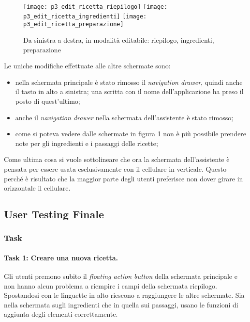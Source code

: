 \begin{figure}[ht]
  \begin{center}
    \texttt{[image: p3\_edit\_ricetta\_riepilogo]}
    \texttt{[image: p3\_edit\_ricetta\_ingredienti]}
    \texttt{[image: p3\_edit\_ricetta\_preparazione]} %
    \caption{Da sinistra a destra, in modalità editabile: riepilogo, ingredienti, preparazione}
    \label{fig:p3_edit_ricetta}
  \end{center}
\end{figure}

Le uniche modifiche effettuate alle altre schermate sono:
\begin{itemize}
  \item nella schermata principale è stato rimosso il \textit{navigation drawer}, quindi anche il tasto in alto a sinistra; una scritta con il nome dell'applicazione ha preso il posto di quest'ultimo;

  \item anche il \textit{navigation drawer} nella schermata dell'assistente è stato rimosso;

  \item come si poteva vedere dalle schermate in figura \ref{fig:p3_edit_ricetta} non è più possibile prendere note per gli ingredienti e i passaggi delle ricette;
\end{itemize}

Come ultima cosa si vuole sottolineare che ora la schermata dell'assistente è pensata per essere usata esclusivamente con il cellulare in verticale.
Questo perché è risultato che la maggior parte degli utenti preferisce non dover girare in orizzontale il cellulare.

\clearpage
\subsection{User Testing Finale}
\subsubsection{Task}
\paragraph{Task 1: Creare una nuova ricetta.}
Gli utenti premono subito il \textit{floating action button} della schermata principale e non hanno alcun problema a riempire i campi della schermata riepilogo.
Spostandosi con le linguette in alto riescono a raggiungere le altre schermate.
Sia nella schermata sugli ingredienti che in quella sui passaggi, usano le funzioni di aggiunta degli elementi correttamente.

